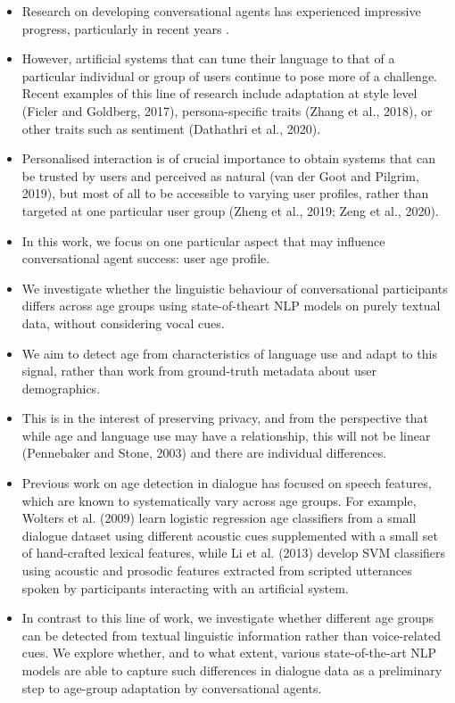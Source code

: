 \begin{itemize}
    \item Research on developing conversational agents has experienced impressive progress, particularly in recent years \citep{mctear2020conversational}. 
    \item However, artificial systems that can tune their language to that of a particular individual or group of users continue to pose more of a challenge. Recent examples of this line of research include adaptation at style level (Ficler and Goldberg, 2017), persona-specific traits (Zhang et al., 2018), or other traits such as sentiment (Dathathri et al., 2020).
    \item Personalised interaction is of crucial importance to obtain systems that can be trusted by users and perceived as natural (van der Goot and Pilgrim, 2019), but most of all to be accessible to varying user profiles, rather than targeted at one particular user group (Zheng et al., 2019; Zeng et al., 2020).
    \item  In this work, we focus on one particular aspect that may influence conversational agent success: user age profile.
    \item We investigate whether the linguistic behaviour of conversational participants differs across age  groups using state-of-theart NLP models on purely textual data, without considering vocal cues. 
    \item We aim to detect age from characteristics of language use and adapt to this signal, rather than work from ground-truth metadata about user demographics. 
    \item {} This is in the interest of preserving privacy, and from the perspective that while age and language use may have a relationship, this will not be linear (Pennebaker and Stone, 2003) and there are individual differences. 
    \item Previous work on age detection in dialogue has
    focused on speech features, which are known to systematically vary across age groups. For example, Wolters et al. (2009) learn logistic regression age classifiers from a small dialogue dataset using different acoustic cues supplemented with a small set of hand-crafted lexical features, while Li et al. (2013) develop SVM classifiers using acoustic and prosodic features extracted from scripted utterances spoken by participants interacting with an artificial system.
    \item In contrast to this line of work, we investigate whether different age groups can be detected from textual linguistic information rather than voice-related cues. We explore whether, and to what extent, various state-of-the-art NLP models are able to capture such differences in dialogue data as a preliminary step to age-group adaptation by conversational agents. 

\end{itemize}
